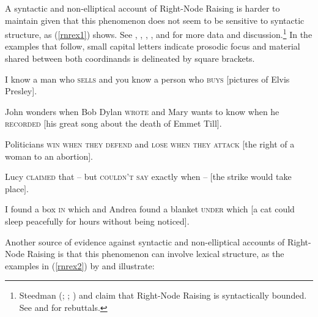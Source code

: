 \eal
{}
\zl


A syntactic\label{coordination:page-rnr-start} and non-elliptical account of Right-Node Raising is harder to maintain given that this phenomenon does not seem to be sensitive to  syntactic structure, as (\ref{rnrex1}) shows. See 
\citet{bresnan74}, %
\citet[299]{wexlercull},  \citet[45]{grosu81}, \citet[--101]{mccawley}, and \citet[382, fn.\,30]{sab}
for more data and discussion.\footnote{%
  Steedman (\citeyear[]{steedman85}; \citeyear[]{gapsteed}; \citeyear[]{steedmanbook}) and
  \citet[183--184]{dowty88} claim that Right-Node Raising is syntactically bounded. See \citet[95]{phil} and \citet[]{Chaves2014a-u} for rebuttals.}
In the examples that follow, small capital letters indicate prosodic focus and material shared between both coordinands is delineated by square brackets.


\eal
\label{rnrex1}
\ex  I know a man who \textsc{sells} and you know a person who \textsc{buys}
                     [pictures of Elvis Presley].

\ex John wonders when Bob Dylan
\textsc{wrote} and Mary wants to know when
  he
\textsc{recorded} [his great song about the death of Emmet Till].
 
 \ex Politicians \textsc{win when they defend} and \textsc{lose when they attack}
[the right of a woman to an abortion].

\ex Lucy \textsc{claimed} that -- but \textsc{couldn't say}
exactly when --  $[$the strike would take place$]$.
 
 \ex I found a box \textsc{in} which and Andrea found a blanket \textsc{under}
which [a cat could sleep peacefully for hours without being
noticed].
\zl

Another source of evidence against syntactic and non-elliptical accounts of Right-Node Raising is that this phenomenon can involve lexical structure,
as the examples in (\ref{rnrex2}) by \citet[1325, fn.\ 44]{rodney} and \citet{chaveslp,chavesrnr} illustrate:

